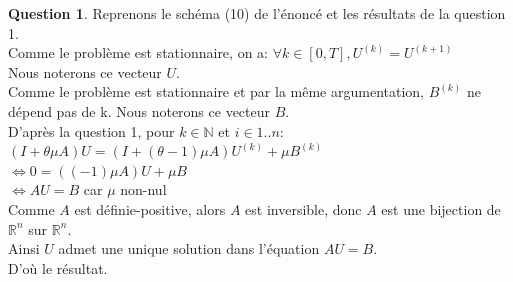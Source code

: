 \documentclass[a4paper]{article}
\theoremstyle{definition}
\newtheorem{que}{Question}
\begin{document}
	\setcounter{que}{5}
	\begin{que}
		Reprenons le schéma (10) de l'énoncé et les résultats de la question 1. \\

		Comme le problème est stationnaire, on a: $\forall k \in [0, T],  U^{(k)}=U^{(k+1)}$ \\
		Nous noterons ce vecteur $U$. \\

		Comme le problème est stationnaire et par la même argumentation, $B^{(k)}$ ne dépend pas de k. Nous noterons ce vecteur $B$. \\

		D'après la question 1, pour $k \in \mathbb{N}$ et $i \in 1..n$: \\
		$(I + \theta \mu A)U = (I + (\theta - 1) \mu A)U^{(k)} + \mu B^{(k)}$ \\
		$\Leftrightarrow 0 = (( - 1) \mu A)U + \mu B$ \\
		$\Leftrightarrow AU = B$ car $\mu$ non-nul \\
		Comme $A$ est définie-positive, alors $A$ est inversible, donc $A$ est une bijection de $\mathbb{R}^n$ sur $\mathbb{R}^n$. \\
		Ainsi $U$ admet une unique solution dans l'équation $AU=B$.\\
		D'où le résultat. \\
	\end{que}
\end{document}
